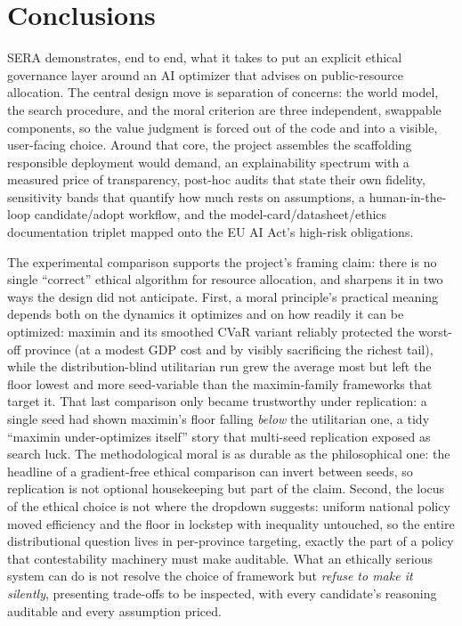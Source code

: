 \documentclass[11pt,a4paper]{article}
\begin{document}
\section{Conclusions}
\label{sec:conclusions}

SERA demonstrates, end to end, what it takes to put an explicit ethical
governance layer around an AI optimizer that advises on public-resource
allocation. The central design move is separation of concerns: the world
model, the search procedure, and the moral criterion are three independent,
swappable components, so the value judgment is forced out of the code and into
a visible, user-facing choice. Around that core, the project assembles the
scaffolding responsible deployment would demand, an explainability spectrum
with a measured price of transparency, post-hoc audits that state their own
fidelity, sensitivity bands that quantify how much rests on assumptions, a
human-in-the-loop candidate/adopt workflow, and the
model-card/datasheet/ethics documentation triplet mapped onto the EU AI Act's
high-risk obligations.

The experimental comparison supports the project's framing claim: there is
no single ``correct'' ethical algorithm for resource allocation, and
sharpens it in two ways the design did not anticipate. First, a moral
principle's practical meaning depends both on the dynamics it optimizes and on
how readily it can be optimized: maximin and its smoothed CVaR variant
reliably protected the worst-off province (at a modest GDP cost and by visibly
sacrificing the richest tail), while the distribution-blind utilitarian run
grew the average most but left the floor lowest and more seed-variable than the
maximin-family frameworks that target it.
That last comparison only became trustworthy under replication: a single seed
had shown maximin's floor falling \emph{below} the utilitarian one, a tidy
``maximin under-optimizes itself'' story that multi-seed replication exposed as
search luck. The methodological moral is as durable as the philosophical one:
the headline of a gradient-free ethical comparison can invert between seeds, so
replication is not optional housekeeping but part of the claim. Second, the locus of the ethical choice is not where the
dropdown suggests: uniform national policy moved efficiency and the floor in
lockstep with inequality untouched, so the entire distributional question
lives in per-province targeting, exactly the part of a policy that
contestability machinery must make auditable. What an ethically serious
system can do is not resolve the choice of framework but \emph{refuse to make
it silently}, presenting trade-offs to be inspected, with every
candidate's reasoning auditable and every assumption priced.
\end{document}
